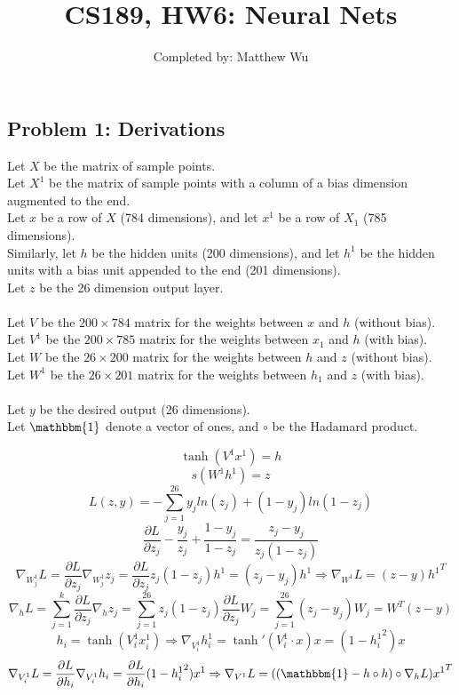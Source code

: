 \documentclass{article}
\title{CS189, HW6: Neural Nets}
\author{ Completed by: Matthew Wu}
\date{}
\begin{document}
\maketitle

\subsection*{Problem 1: Derivations}

Let $X$ be the matrix of sample points.\\
Let $X^1$ be the matrix of sample points with a column of a bias dimension augmented to the end.\\
Let $x$ be a row of $X$ (784 dimensions), and let $x^1$ be a row of $X_1$ (785 dimensions).\\
Similarly, let $h$ be the hidden units (200 dimensions), and let $h^1$ be the hidden units with a bias unit appended to the end (201 dimensions).\\
Let $z$ be the 26 dimension output layer.\\
\\
Let $V$ be the $200 \times 784$ matrix for the weights between $x$ and $h$ (without bias).\\
Let $V^1$ be the $200 \times 785$ matrix for the weights between $x_1$ and $h$ (with bias).\\
Let $W$ be the $26 \times 200$ matrix for the weights between $h$ and $z$ (without bias).\\
Let $W^1$ be the $26 \times 201$ matrix for the weights between $h_1$ and $z$ (with bias).\\
\\
Let $y$ be the desired output (26 dimensions).\\
Let $\mathbbm{1}$ denote a vector of ones, and $\circ$ be the Hadamard product.

$$\tanh(V^1x^1)=h$$
$$s(W^1h^1)=z$$
$$L(z, y) = -\sum_{j=1}^{26}y_jln(z_j) + (1-y_j)ln(1-z_j)$$
$$\frac{\partial L}{\partial z_j} -\frac{y_j}{z_j}+\frac{1-y_j}{1-z_j}=\frac{z_j-y_j}{z_j(1-z_j)}$$
$$\nabla_{W^1_j}L=\frac{\partial L}{\partial z_j}\nabla_{W^1_j}z_j=\frac{\partial L}{\partial z_j} z_j(1-z_j)h^1=(z_j-y_j)h^1 \Rightarrow \nabla_{W^1}L=(z-y){h^1}^T$$
$$\nabla_hL = \sum_{j=1}^k \frac{\partial L}{\partial z_j}\nabla_hz_j=\sum_{j=1}^{26}z_j(1-z_j)\frac{\partial L}{\partial z_j}W_j = \sum_{j=1}^{26}(z_j-y_j)W_j=W^T(z-y)$$
$$h_i=\tanh(V^1_ix^1_i)\Rightarrow \nabla_{V^1_i}h^1_i=\tanh'(V^1_i \cdot x)x=(1-{h^1_i}^2)x$$
$$\nabla_{V^1_i}L=\frac{\partial L}{\partial h_i}\nabla_{V^1_i}h_i=\frac{\partial L}{\partial h_i}(1-{h^1_i}^2)x^1 \Rightarrow \nabla_{V^1}L=((\mathbbm{1}-h \circ h) \circ \nabla_hL){x^1}^T$$
\end{document}

